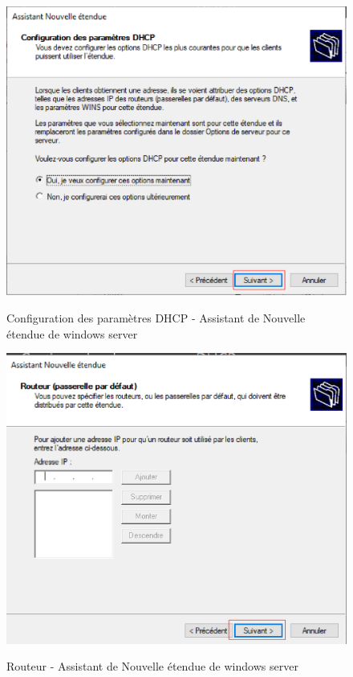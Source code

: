 \begin{figure}[h!]
	\begin{center}
		\caption{Configuration des paramètres DHCP - Assistant de Nouvelle étendue de windows server}
		\includegraphics[scale=0.7]{WS_Screenshots/43.png}
		\label{Funcs_WinS/15}
	\end{center}
\end{figure}
\FloatBarrier 
    

\begin{figure}[h!]
	\begin{center}
		\caption{Routeur - Assistant de Nouvelle étendue de windows server}
		\includegraphics[scale=0.7]{WS_Screenshots/44.png}
		\label{Funcs_WinS/16}
	\end{center}
\end{figure}
\FloatBarrier 
    

